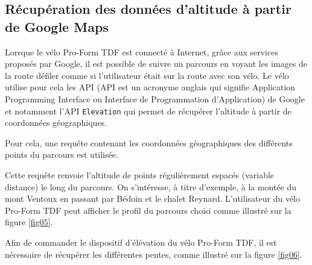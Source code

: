 \newpage

\subsection{Récupération des données d'altitude à partir de Google Maps}


Lorsque le vélo Pro-Form TDF est connecté à Internet, grâce aux services proposés par Google, il est possible de suivre un parcours en voyant les images de la route défiler comme si l'utilisateur était sur la route avec son vélo. Le vélo utilise pour cela les API (API est un acronyme anglais qui signifie \og Application Programming Interface \fg ou Interface de Programmation d'Application) de Google et notamment l'API \verb?Elevation? qui permet de récupérer l'altitude à partir de coordonnées géographiques.

Pour cela, une requête contenant les coordonnées géographiques des différents points du parcours est utilisée.

Cette requête renvoie l'altitude de points régulièrement espacés (variable distance) le long du parcours. On s'intéresse, à titre d'exemple, à la montée du mont Ventoux en passant par Bédoin et le chalet Reynard. L'utilisateur du vélo Pro-Form TDF peut afficher le profil du parcours choisi comme illustré sur la figure \ref{fig05}.


Afin de commander le dispositif d'élévation du vélo Pro-Form TDF, il est nécessaire de récupérer les différentes pentes, comme illustré sur la figure \ref{fig06}.



